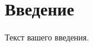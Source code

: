 \documentclass[a4paper,14pt]{extarticle}
\begin{document}
	
\newpage

\section{Введение}
Текст вашего введения.
	
\end{document}
